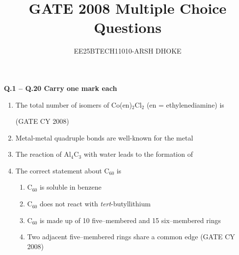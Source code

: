 \documentclass[12pt]{article}
\author{EE25BTECH11010-ARSH DHOKE}
\title{GATE 2008 Multiple Choice Questions}
\date{}
\begin{document}
\maketitle

\textbf{Q.1 -- Q.20 Carry one mark each}

\begin{enumerate}
   \item The total number of isomers of Co(en)$_2$Cl$_2$ (en = ethylenediamine) is
   \begin{enumerate}
    \hfill (GATE CY 2008)
   \end{enumerate}
   

   
    \item   Metal-metal quadruple bonds are well-known for the metal
\begin{enumerate}
\hfill{}
\end{enumerate}

    \item The reaction of Al$_4$C$_3$ with water leads to the formation of
   \begin{enumerate}
    \end{enumerate}
\hfill{}

 \item The correct statement about C$_{60}$ is
\begin{enumerate}
        \item  C$_{60}$ is soluble in benzene 
        \item  C$_{60}$ does not react with \textit{tert}-butyllithium 
        \item  C$_{60}$ is made up of 10 five–membered and 15 six–membered rings 
        \item  Two adjacent five–membered rings share a common edge
    \hfill (GATE CY 2008)
    \end{enumerate}


\end{enumerate}
\end{document}
